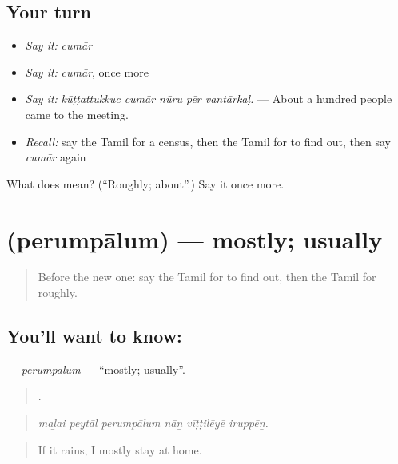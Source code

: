 \subsection*{Your turn}
\begin{itemize}
\raggedright
  \item \emph{Say it:} \emph{cumār}
  \item \emph{Say it:} \emph{cumār}, once more
  \item \emph{Say it:} \emph{kūṭṭattukkuc cumār nūṟu pēr vantārkaḷ.} — About a hundred people came to the meeting.
  \item \emph{Recall:} say the Tamil for a census, then the Tamil for to find out, then say \emph{cumār} again
\end{itemize}

\begin{tcolorbox}[breakable,colback=teal!4,colframe=teal!35!black,title={Before you move on}]
What does  mean? (\textquotedblleft{}Roughly; about\textquotedblright{}.) Say it once more.
\end{tcolorbox}
\section[\texorpdfstring{\ta{பெரும்பாலும்} (perumpālum)}{பெரும்பாலும் (perumpālum)}]{ (perumpālum) — mostly; usually}

\label{lesson:TA-C393-perumpalum}



\begin{quote}
Before the new one: say the Tamil for to find out, then the Tamil for roughly.
\end{quote}

\subsection*{You'll want to know: }
\textbf{} — \emph{perumpālum} — \textquotedblleft{}mostly; usually\textquotedblright{}.

\begin{quote}
     .
\end{quote}

\begin{quote}
\emph{maḻai peytāl perumpālum nāṉ vīṭṭilēyē iruppēṉ.}
\end{quote}

\begin{quote}
If it rains, I mostly stay at home.
\end{quote}

